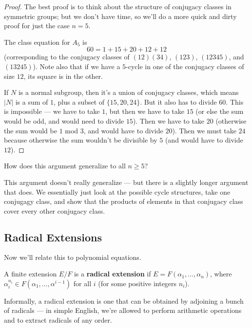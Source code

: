 \begin{proof}
    The best proof is to think about the structure of conjugacy classes in symmetric groups; but we don't have time, so we'll do a more quick and dirty proof for just the case $n = 5$. 
    
    The class equation for $A_5$ is \[60 = 1 + 15 + 20 + 12 + 12\] (corresponding to the conjugacy classes of $(12)(34)$, $(123)$, $(12345)$, and $(13245)$). Note also that if we have a $5$-cycle in one of the conjugacy classes of size $12$, its square is in the other. 

    If $N$ is a normal subgroup, then it's a union of conjugacy classes, which means $\lvert N \rvert$ is a sum of $1$, plus a subset of $\{15, 20, 24\}$. But it also has to divide $60$. This is impossible --- we have to take $1$, but then we have to take $15$ (or else the sum would be odd, and would need to divide $15$). Then we have to take $20$ (otherwise the sum would be $1$ mod $3$, and would have to divide $20$). Then we must take $24$ because otherwise the sum wouldn't be divisible by $5$ (and would have to divide $12$). 
\end{proof}

\begin{question}
    How does this argument generalize to all $n \geq 5$?
\end{question}

\begin{ans}
This argument doesn't really generalize --- but there is a slightly longer argument that does. We essentially just look at the possible cycle structures, take one conjugagy class, and show that the products of elements in that conjugacy class cover every other conjugacy class. 
\end{ans}

\subsection{Radical Extensions}

Now we'll relate this to polynomial equations. 

\begin{definition}
    A finite extension $E/F$ is a \textbf{radical extension} if $E = F(\alpha_1, \ldots, \alpha_n)$, where $\alpha_i^{n_i} \in F(\alpha_1, \ldots, \alpha^{i - 1})$ for all $i$ (for some positive integers $n_i$). 
\end{definition}

Informally, a radical extension is one that can be obtained by adjoining a bunch of radicals --- in simple English, we're allowed to perform arithmetic operations and to extract radicals of any order.

